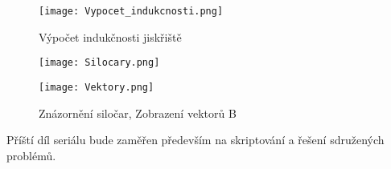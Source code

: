 \documentclass[a4paper, oneside]{article}
\begin{document}
\begin{figure}[htbp]
\centering
\texttt{[image: Vypocet\_indukcnosti.png]}\\
\caption{Výpočet indukčnosti jiskřiště}
\end{figure}

\begin{figure}[htbp]
	\begin{minipage}{5cm}
		\centering
		\texttt{[image: Silocary.png]}
	\end{minipage}
	\begin{minipage}{5cm}
		\centering
		\texttt{[image: Vektory.png]}
	\end{minipage}
\caption{Znázornění siločar, Zobrazení vektorů B}
\end{figure}	

Příští díl seriálu bude zaměřen především na skriptování a řešení sdružených problémů.\\
\end{document}
